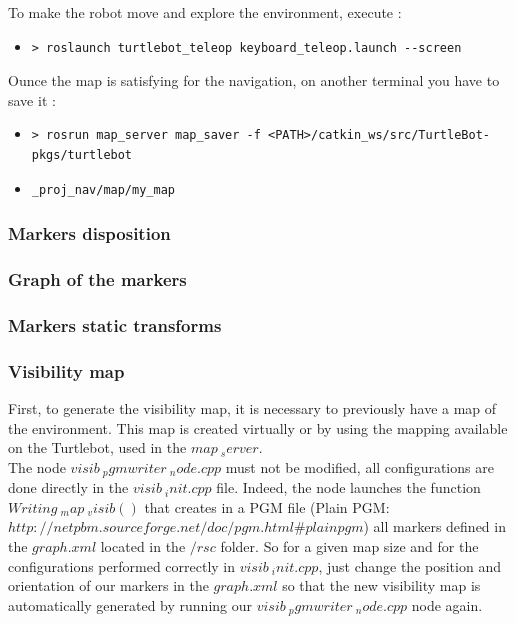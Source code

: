 \documentclass[10pt,a4paper]{article}
\begin{document}
To make the robot move and explore the environment, execute :

\begin{itemize}
\item[]  \begin{verbatim}> roslaunch turtlebot_teleop keyboard_teleop.launch --screen \end{verbatim}
\end{itemize}

Ounce the map is satisfying for the navigation, on another terminal you have to save it :

\begin{itemize}
\item[]  \begin{verbatim}> rosrun map_server map_saver -f <PATH>/catkin_ws/src/TurtleBot-pkgs/turtlebot\end{verbatim}
\item[]  \begin{verbatim}_proj_nav/map/my_map\end{verbatim}

\end{itemize}

\subsubsection{Markers disposition}

\subsubsection{Graph of the markers}

\subsubsection{Markers static transforms}

\subsubsection{Visibility map}

First, to generate the visibility map, it is necessary to previously have a map of the environment. This map is created virtually or by using the mapping available on the Turtlebot, used in the $ map \ _server $.\\

The node $ visib \ _pgmwriter \ _node.cpp $ must not be modified, all configurations are done directly in the $ visib \ _init.cpp $ file. Indeed, the node launches the function $ Writing \ _map \ _visib () $ that creates in a PGM file (Plain PGM: $ http://netpbm.sourceforge.net/doc/pgm.html\#plainpgm $) all markers defined in the $ graph.xml $ located in the $ / rsc $ folder. So for a given map size and for the configurations performed correctly in $ visib \ _init.cpp $, just change the position and orientation of our markers in the $ graph.xml $ so that the new visibility map is automatically generated by running our $ visib \ _pgmwriter \ _node.cpp $ node again. \\
\end{document}

